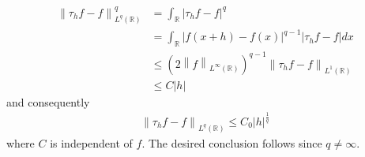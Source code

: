 \documentclass[a4paper,oneside]{article}
\numberwithin{equation}{section}
\begin{document}
\begin{align}
\left\| {{\tau _h}f - f} \right\|_{{L^q}\left( {\mathbb{R}} \right)}^q &= \int_{\mathbb{R}} {{{\left| {{\tau _h}f - f} \right|}^q}} \\
& = \int_{\mathbb{R}} {{{\left| {f\left( {x + h} \right) - f\left( x \right)} \right|}^{q - 1}}\left| {{\tau _h}f - f} \right|dx} \\
& \le {\left( {2{{\left\| f \right\|}_{{L^\infty }\left( {\mathbb{R}} \right)}}} \right)^{q - 1}}{\left\| {{\tau _h}f - f} \right\|_{{L^1}\left( {\mathbb{R}} \right)}}\\
&\le C\left| h \right|
\end{align}
and consequently
\begin{align}
\label{1.305}
{\left\| {{\tau _h}f - f} \right\|_{{L^q}\left( \mathbb{R} \right)}} \le C_0{\left| h \right|^{\frac{1}{q}}}
\end{align}
where $C$ is independent of $f$. The desired conclusion follows since $q\ne \infty$.
\end{document}
